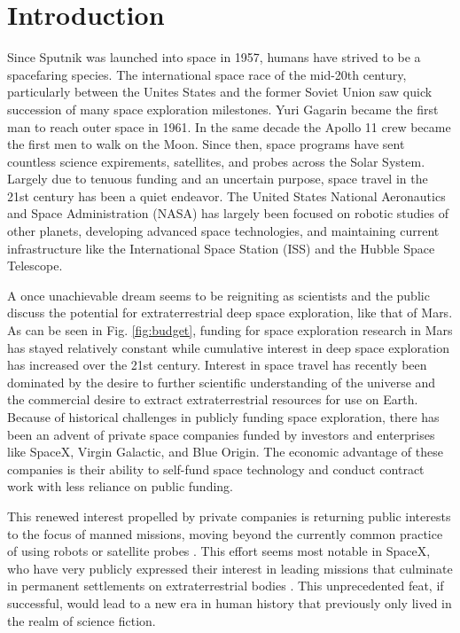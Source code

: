 \section{Introduction}

Since Sputnik was launched into space in 1957, humans have strived to be a spacefaring species. The international space race of the mid-20th century, particularly between the Unites States and the former Soviet Union saw quick succession of many space exploration milestones. Yuri Gagarin became the first man to reach outer space in 1961. In the same decade the Apollo 11 crew became the first men to walk on the Moon. Since then, space programs have sent countless science expirements, satellites, and probes across the Solar System. Largely due to tenuous funding and an uncertain purpose, space travel in the 21st century has been a quiet endeavor. The United States National Aeronautics and Space Administration (NASA) has largely been focused on robotic studies of other planets, developing advanced space technologies, and maintaining current infrastructure like the International Space Station (ISS) and the Hubble Space Telescope.

A once unachievable dream seems to be reigniting as scientists and the public discuss the potential for extraterrestrial deep space exploration, like that of Mars. As can be seen in Fig. \ref{fig:budget}, funding for space exploration research in Mars has stayed relatively constant while cumulative interest in deep space exploration has increased over the 21st century. Interest in space travel has recently been dominated by the desire to further scientific understanding of the universe and the commercial desire to extract extraterrestrial resources for use on Earth. Because of historical challenges in publicly funding space exploration, there has been an advent of private space companies funded by investors and enterprises like SpaceX, Virgin Galactic, and Blue Origin. The economic advantage of these companies is their ability to self-fund space technology and conduct contract work \cite{space-contract} with less reliance on public funding.

This renewed interest propelled by private companies is returning public interests to the focus of manned missions, moving beyond the currently common practice of using robots or satellite probes \cite{nasa-landers}. This effort seems most notable in SpaceX, who have very publicly expressed their interest in leading missions that culminate in permanent settlements on extraterrestrial bodies \cite{spacex-mars-press}. This unprecedented feat, if successful, would lead to a new era in human history that previously only lived in the realm of science fiction.

